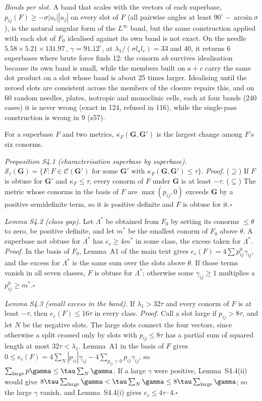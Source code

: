 \documentclass[preprint,pdf]{iucr}          %
\newcommand{\Ang}{\text{\AA}}
\newcommand{\Gmet}{\mathbf{G}}
\newcommand{\Sw}{\mathcal{S}_\tau}
\newcommand{\Cl}{\mathcal{C}}
\begin{document}
\emph{Bands per slot.} A band that scales with the vectors of each superbase, $p_{ij}(F)\ge-\sigma|u_i||u_j|$ on every slot of $F$ (all pairwise angles at least $90^\circ-\arcsin\sigma$), is the natural angular form of the $L^\infty$ band, but the same construction applied with each slot of $F_0$ idealised against its own band is not exact. On the needle $5.58\times5.21\times131.97$\,\Ang, $\gamma=91.12^\circ$, at $\lambda_1/(\sigma l_al_c)=33$ and $40$, it returns 6 superbases where brute force finds 12: the conorm $ab$ survives idealisation because its own band is small, while the members built on $a+c$ carry the same dot product on a slot whose band is about 25 times larger. Idealising until the zeroed slots are consistent across the members of the closure repairs this, and on 60 random needles, plates, isotropic and monoclinic cells, each at four bands (240 cases) it is never wrong (exact in 124, refused in 116), while the single-pass construction is wrong in 9 (z57).

For a superbase $F$ and two metrics, $\kappa_F(\Gmet,\Gmet')$ is the largest change among $F$'s six conorms.

\emph{Proposition S4.1 (characterisation superbase by superbase).} $\Sw(\Gmet)=\{F:F\in\Cl(\Gmet')\text{ for some }\Gmet'\text{ with }\kappa_F(\Gmet,\Gmet')\le\tau\}$. \emph{Proof.} ($\supseteq$) If $F$ is obtuse for $\Gmet'$ and $\kappa_F\le\tau$, every conorm of $F$ under $\Gmet$ is at least $-\tau$. ($\subseteq$) The metric whose conorms in the basis of $F$ are $\max(p_{ij},0)$ exceeds $\Gmet$ by a positive semidefinite term, so it is positive definite and $F$ is obtuse for it.\hfill$\square$

\emph{Lemma S4.2 (class gap).} Let $\Lambda^*$ be obtained from $F_0$ by setting its conorms $\le\theta$ to zero, be positive definite, and let $m^*$ be the smallest conorm of $F_0$ above $\theta$. A superbase not obtuse for $\Lambda^*$ has $e_c\ge4m^*$ in some class, the excess taken for $\Lambda^*$. \emph{Proof.} In the basis of $F_0$, Lemma~A1 of the main text gives $e_c(F)=4\sum p^0_{ij}\gamma_{ij}$, and the excess for $\Lambda^*$ is the same sum over the slots above $\theta$. If those terms vanish in all seven classes, $F$ is obtuse for $\Lambda^*$; otherwise some $\gamma_{ij}\ge1$ multiplies a $p^0_{ij}\ge m^*$.\hfill$\square$

\emph{Lemma S4.3 (small excess in the band).} If $\lambda_1>32\tau$ and every conorm of $F$ is at least $-\tau$, then $e_c(F)\le16\tau$ in every class. \emph{Proof.} Call a slot large if $p_{ij}>8\tau$, and let $N$ be the negative slots. The large slots connect the four vectors, since otherwise a split crossed only by slots with $p_{ij}\le8\tau$ has a partial sum of squared length at most $32\tau<\lambda_1$. Lemma~A1 in the basis of $F$ gives $0\le e_c(F)=4\sum_N|p_{ij}|\gamma_{ij}-4\sum_{p_{ij}>0}p_{ij}\gamma_{ij}$, so $\sum_{\rm large}p\gamma\le\tau\sum_N\gamma$. If a large $\gamma$ were positive, Lemma~S4.4(ii) would give $8\tau\sum_{\rm large}\gamma<\tau\sum_N\gamma\le8\tau\sum_{\rm large}\gamma$; so the large $\gamma$ vanish, and Lemma~S4.4(i) gives $e_c\le4\tau\cdot4$.\hfill$\square$
\end{document}
